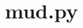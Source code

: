 \documentclass[a4paper, 10pt]{article}
\begin{document}
\maketitle

\newpage

\section{mud.py}

%
\end{document}

